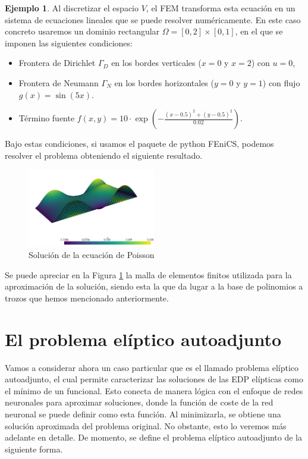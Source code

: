 \documentclass[a4paper,11pt,spanish, twoside, leqno]{tfg-uam}
\theoremstyle{definition}
\newtheorem{exmp}[teor]{Ejemplo}
\begin{document}
\begin{mdframed}
\begin{exmp}
    Al discretizar el espacio $V$, el FEM transforma esta ecuación en un sistema de ecuaciones lineales que se puede resolver numéricamente. En este caso concreto usaremos un dominio rectangular $\Omega = [0,2] \times [0,1]$, en el que se imponen las siguientes condiciones:  
    \begin{itemize}
        \item Frontera de Dirichlet $\Gamma_D$ en los bordes verticales ($x=0$ y $x=2$) con $u=0$,  
        \item Frontera de Neumann $\Gamma_N$ en los bordes horizontales ($y=0$ y $y=1$) con flujo $g(x) = \sin(5x)$.
        \item Término fuente $f(x, y) = 10 \cdot\exp \left( - \frac{(x - 0.5)^2 + (y - 0.5)^2}{0.02} \right)$.  
    \end{itemize}

    Bajo estas condiciones, si usamos el paquete de python FEniCS, podemos resolver el problema obteniendo el siguiente resultado.
    \begin{figure}[H] 
        \centering
        \includegraphics[width=0.5\textwidth]{Figuras/poisson.png}
        \caption{Solución de la ecuación de Poisson}
        \label{fig:poisson}
    \end{figure}
     Se puede apreciar en la Figura \ref{fig:poisson} la malla de elementos finitos utilizada para la aproximación de la solución, siendo esta la que da lugar a la base de polinomios a trozos que hemos mencionado anteriormente. 
\end{exmp}
\end{mdframed}

\section{El problema elíptico autoadjunto}

Vamos a considerar ahora un caso particular que es el llamado problema elíptico autoadjunto, el cual permite caracterizar las soluciones de las EDP elípticas como el mínimo de un funcional. Esto conecta de manera lógica con el enfoque de redes neuronales para aproximar soluciones, donde la función de coste de la red neuronal se puede definir como esta función. Al minimizarla, se obtiene una solución aproximada del problema original. No obstante, esto lo veremos más adelante en detalle. De momento, se define el problema elíptico autoadjunto de la siguiente forma.
\end{document}
